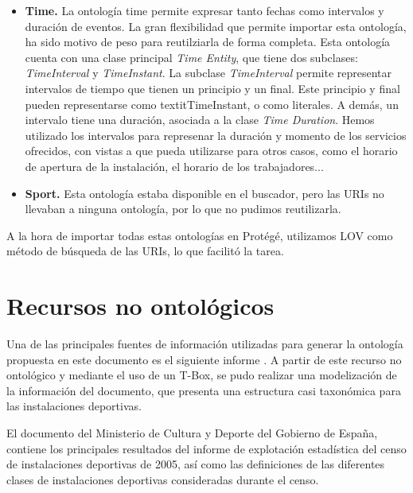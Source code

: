 \documentclass[a4paper,12pt]{article}
\begin{document}
	\begin{itemize}
		\item \textbf{Time.} La ontología time permite expresar tanto fechas como intervalos y duración de eventos. La gran flexibilidad que permite importar esta ontología, ha sido motivo de peso para reutilziarla de forma completa. Esta ontología cuenta con una clase principal \textit{Time Entity}, que tiene dos subclases: \textit{TimeInterval} y \textit{TimeInstant}. La subclase \textit{TimeInterval} permite representar intervalos de tiempo que tienen un principio y un final. Este principio y final pueden representarse como textit{TimeInstant}, o como literales. A demás, un intervalo tiene una duración, asociada a la clase \textit{Time Duration}. Hemos utilizado los intervalos para represenar la duración y momento de los servicios ofrecidos, con vistas a que pueda utilizarse para otros casos, como el horario de apertura de la instalación, el horario de los trabajadores... 
		\item \textbf{Sport.} Esta ontología estaba disponible en el buscador, pero las URIs no llevaban a ninguna ontología, por lo que no pudimos reutilizarla. 
	\end{itemize}
	A la hora de importar todas estas ontologías en Protégé, utilizamos LOV como método de búsqueda de las URIs, lo que facilitó la tarea. 
	
	\section{Recursos no ontológicos}
	
	Una de las principales fuentes de información utilizadas para generar la ontología propuesta en este documento es el siguiente informe \cite{pdf-culturaydeporte}. A partir de este recurso no ontológico y mediante el uso de un T-Box, se pudo realizar una modelización de la información del documento, que presenta una estructura casi taxonómica para las instalaciones deportivas. 
	
	El documento \cite{pdf-culturaydeporte} del Ministerio de Cultura y Deporte del Gobierno de España, contiene los  principales resultados del informe de explotación estadística del censo de instalaciones deportivas de 2005, así como las definiciones de las diferentes clases de instalaciones deportivas consideradas durante el censo.
	
\end{document}
